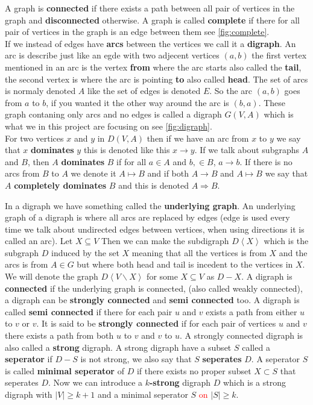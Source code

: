 A graph is \textbf{connected} if there exists a path between all pair of vertices in the graph and \textbf{disconnected} otherwise.
A graph is called \textbf{complete} if there for all pair of vertices in the graph is an edge between them see \autoref{fig:complete}.\\

If we instead of edges have \textbf{arcs} between the vertices we call it a \textbf{digraph}.
An arc is describe just like an egde with two adjecent vertices $(a,b)$ the first vertex mentioned in an arc is the vertex \textbf{from} where the arc starts also called the \textbf{tail}, the second vertex is where the arc is pointing \textbf{to} also called \textbf{head}. The set of arcs is normaly denoted $A$ like the set of edges is denoted $E$. 
So the arc $(a,b)$ goes from $a$ to $b$, if you wanted it the other way around the arc is $(b,a)$.
These graph contaning only arcs and no edges is called a digraph $G(V,A)$ which is what we in this project are focusing on see \autoref{fig:digraph}.\\
For two vertices $x$ and $y$ in $D(V,A)$ then if we have an arc from $x$ to $y$ we say that $x$ \textbf{dominates} $y$ this is denoted like this $x \rightarrow y$. If we talk about subgraphs $A$ and $B$, then $A$ \textbf{dominates} $B$ if for all $a\in A$ and $b,\in B$, $a \rightarrow b$. If there is no arcs from $B$ to $A$ we denote it $A\mapsto B$ and if both $A\rightarrow B$ and $A \mapsto B$ we say that $A$ \textbf{completely dominates} $B$ and this is denoted $A\Rightarrow B$. 

In a digraph we have something called the \textbf{underlying graph}. 
An underlying graph of a digraph is where all arcs are replaced by edges (edge is used every time we talk about undirected edges between vertices, when using directions it is called an arc).
Let $X \subseteq V$ Then we can make the subdigraph $D\left< X\right>$ which is the subgraph $D$ induced by the set $X$ meaning that all the vertices is from $X$ and the arcs is from $A\in G$ but where both head and tail is incedent to the vertices in $X$. We will denote the graph $D\left< V\backslash X\right>$ for some $X\subseteq V$ as $D-X$.
A digraph is \textbf{connected} if the underlying graph is connected, (also called weakly connected), a digraph can be \textbf{strongly connected} and \textbf{semi connected} too.
A digraph is called \textbf{semi connected} if there for each pair $u$ and $v$ exists a path from either $u$ to $v$ or $v$.  
It is said to be \textbf{strongly connected} if for each pair of vertices $u$ and $v$ there exists a path from both $u$ to $v$ and $v$ to $u$. A strongly connected digraph is also called a \textbf{strong} digraph. 
A strong digraph have a subset $S$ called a \textbf{seperator} if $D-S$ is not strong, we also say that $S$ \textbf{seperates} $D$. 
A seperator $S$ is called \textbf{minimal seperator} of $D$ if there exists no proper subset $X\subset S$ that seperates $D$.
Now we can introduce a \textbf{$k$-strong} digraph $D$ which is a strong digraph with $|V|\geq k+1$ and a minimal seperator $S$ \textcolor{red}{on} $|S|\geq k$.

